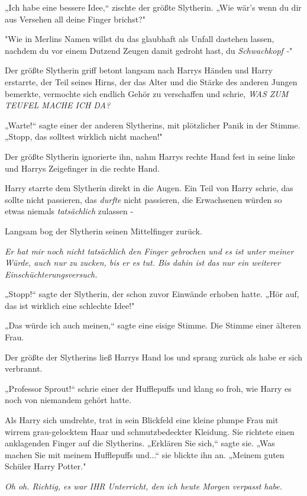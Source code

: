 {„Ich habe eine bessere Idee,“ zischte der größte Slytherin. „Wie wär's wenn du dir aus Versehen all deine Finger brichst?"

"Wie in Merlins Namen willst du das glaubhaft als Unfall dastehen lassen, nachdem du vor einem Dutzend Zeugen damit gedroht hast, du \emph{Schwachkopf -}"

Der größte Slytherin griff betont langsam nach Harrys Händen und Harry erstarrte, der Teil seines Hirns, der das Alter und die Stärke des anderen Jungen bemerkte, vermochte sich endlich Gehör zu verschaffen und schrie, \emph{WAS ZUM TEUFEL MACHE ICH DA?}

„Warte!“ sagte einer der anderen Slytherins, mit plötzlicher Panik in der Stimme. „Stopp, das solltest wirklich nicht machen!"

Der größte Slytherin ignorierte ihn, nahm Harrys rechte Hand fest in seine linke und Harrys Zeigefinger in die rechte Hand.

Harry starrte dem Slytherin direkt in die Augen. Ein Teil von Harry schrie, das sollte nicht passieren, das \emph{durfte} nicht passieren, die Erwachsenen würden so etwas niemals \emph{tatsächlich} zulassen -

Langsam bog der Slytherin seinen Mittelfinger zurück.

\emph{Er hat mir noch nicht tatsächlich den Finger gebrochen und es ist unter meiner Würde, auch nur zu zucken, bis er es tut. Bis dahin ist das nur ein weiterer Einschüchterungsversuch.}

„Stopp!“ sagte der Slytherin, der schon zuvor Einwände erhoben hatte. „Hör auf, das ist wirklich eine schlechte Idee!"

„Das würde ich auch meinen,“ sagte eine eisige Stimme. Die Stimme einer älteren Frau.

Der größte der Slytherins ließ Harrys Hand los und sprang zurück als habe er sich verbrannt.

„Professor Sprout!“ schrie einer der Hufflepuffs und klang so froh, wie Harry es noch von niemandem gehört hatte.

Als Harry sich umdrehte, trat in sein Blickfeld eine kleine plumpe Frau mit wirrem grau-gelocktem Haar und schmutzbedeckter Kleidung. Sie richtete einen anklagenden Finger auf die Slytherins. „Erklären Sie sich,“ sagte sie. „Was machen Sie mit meinem Hufflepuffs und...“ sie blickte ihn an. „Meinem guten Schüler Harry Potter."

\emph{Oh oh. Richtig, es war IHR Unterricht, den ich heute Morgen verpasst habe.}

}
